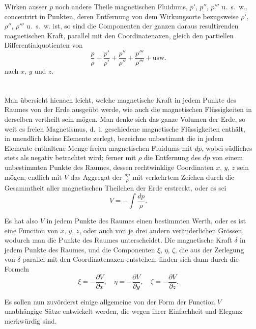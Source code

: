 \documentclass[fontsize=11pt,paper=a4,twoside,openany]{scrbook}
\begin{document}
Wirken ausser $p$ noch andere Theile magnetischen Fluidums, $p'$, $p''$, $p'''$ u.~s.~w., concentrirt in Punkten, deren Entfernung von dem Wirkungsorte bezugsweise $\rho'$, $\rho''$, $\rho'''$ u.~s.~w. ist, so sind die Componenten der ganzen daraus resultirenden magnetischen Kraft, parallel mit den Coordinatenaxen, gleich den partiellen Differentialquotienten von
\[
\frac{p}{\rho} + \frac{p'}{\rho'} + \frac{p''}{\rho''} + \frac{p'''}{\rho'''} + \text{usw.}
\]
nach $x$, $y$ und $z$.

\section{}

Man übersieht hienach leicht, welche magnetische Kraft in jedem Punkte des Raumes von der Erde ausgeübt werde, wie auch die magnetischen Flüssigkeiten in derselben vertheilt sein mögen. Man denke sich das ganze Volumen der Erde, so weit es freien Magnetismus, d.~i. geschiedene magnetische Flüssigkeiten enthält, in unendlich kleine Elemente zerlegt, bezeichne unbestimmt die in jedem Elemente enthaltene Menge freien magnetischen Fluidums mit $dp$, wobei südliches stets als negativ betrachtet wird; ferner mit $\rho$ die Entfernung des $dp$ von einem unbestimmten Punkte des Raumes, dessen rechtwinklige Coordinaten $x$, $y$, $z$ sein mögen, endlich mit $V$ das Aggregat der $\frac{dp}{\rho}$ mit verkehrtem Zeichen durch die Gesammtheit aller magnetischen Theilchen der Erde erstreckt, oder es sei
\[
V = -\int\frac{dp}{\rho}.
\]

Es hat also $V$ in jedem Punkte des Raumes einen bestimmten Werth, oder es ist eine Function von $x$, $y$, $z$, oder auch von je drei andern veränderlichen Grössen, wodurch man die Punkte des Raumes unterscheidet. Die magnetische Kraft $\delta$ in jedem Punkte des Raumes, und die Componenten $\xi$, $\eta$, $\zeta$, die aus der Zerlegung von $\delta$ parallel mit den Coordinatenaxen entstehen, finden sich dann durch die Formeln
\[
\xi = -\frac{\partial V}{\partial x},\quad \eta = -\frac{\partial V}{\partial y},\quad \zeta = -\frac{\partial V}{\partial z}.
\]

Es sollen nun zuvörderst einige allgemeine von der Form der Function $V$ unabhängige Sätze entwickelt werden, die wegen ihrer Einfachheit und Eleganz merkwürdig sind.

\section{}
\end{document}
